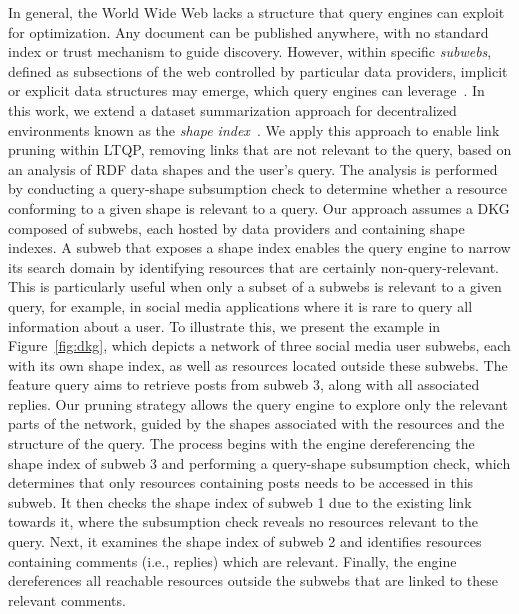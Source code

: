 In general, the World Wide Web lacks a structure that query engines can exploit for optimization.  
Any document can be published anywhere, with no standard index or trust mechanism to guide discovery.  
However, within specific \emph{subwebs}, defined as subsections of the web controlled by particular data providers, implicit or explicit data structures may emerge, which query engines can leverage~\cite{Bogaerts2021LinkTW}.
In this work, we extend a dataset summarization approach for decentralized environments known as the \emph{shape index}~\cite{tam2024opportunitiesshapebasedoptimizationlink}.
We apply this approach to enable link pruning within LTQP, removing links that are not relevant to the query, based on an analysis of RDF data shapes and the user's query.
The analysis is performed by conducting a query-shape subsumption check to determine whether a resource conforming to a given shape is relevant to a query.
Our approach assumes a DKG composed of subwebs, each hosted by data providers and containing shape indexes.
A subweb that exposes a shape index enables the query engine to narrow its search domain by identifying resources that are certainly non-query-relevant.
This is particularly useful when only a subset of a subwebs is relevant to a given query, for example, in social media applications where it is rare to query all information about a user.
To illustrate this, we present the example in Figure~\ref{fig:dkg}, which depicts a network of three social media user subwebs, each with its own shape index, as well as resources located outside these subwebs.
The feature query aims to retrieve posts from subweb 3, along with all associated replies.
Our pruning strategy allows the query engine to explore only the relevant parts of the network, guided by the shapes associated with the resources and the structure of the query.
The process begins with the engine dereferencing the shape index of subweb 3 and performing a query-shape subsumption check, which determines that only resources containing posts needs to be accessed in this subweb.  
It then checks the shape index of subweb 1 due to the existing link towards it, where the subsumption check reveals no resources relevant to the query.  
Next, it examines the shape index of subweb 2 and identifies resources containing comments (i.e., replies) which are relevant.  
Finally, the engine dereferences all reachable resources outside the subwebs that are linked to these relevant comments.
